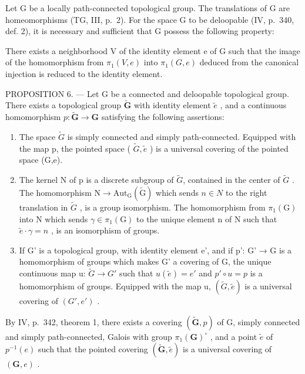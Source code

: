 Let G be a locally path-connected topological group. The translations of G are homeomorphisms (TG, III, p.~2). For the space G to be deloopable (IV, p.~340, def. 2), it is necessary and sufficient that G possess the following property:

There exists a neighborhood V of the identity element e of G such that the image of the homomorphism from \(\pi_{1}(V,e)\) into \(\pi_{1}(G,e)\) deduced from the canonical injection is reduced to the identity element.

PROPOSITION 6. --- Let G be a connected and deloopable topological group. There exists a topological group \(\widetilde{\mathbf{G}}\) with identity element \(\widetilde{e}\) , and a continuous homomorphism \(p\colon \widetilde{\mathbf{G}}\to \mathbf{G}\) satisfying the following assertions:

\begin{enumerate}
\def\labelenumi{\alph{enumi})}
\item
  The space \(\widetilde{G}\) is simply connected and simply path-connected. Equipped with the map p, the pointed space ( \(\widetilde{G},\widetilde{e}\) ) is a universal covering of the pointed space (G,e).
\item
  The kernel N of p is a discrete subgroup of \(\widetilde{G}\), contained in the center of \(\widetilde{G}\) . The homomorphism \(\mathrm{N}\to\mathrm{Aut}_{\mathrm{G}}(\widetilde{\mathrm{G}})\) which sends \(n\in N\) to the right translation in \(\widetilde{G}\) , is a group isomorphism. The homomorphism from \(\pi_{1}(\mathrm{G})\) into N which sends \(\gamma\in\pi_{1}(\mathrm{G})\) to the unique element n of N such that \(\widetilde{e}\cdot\gamma=n\) , is an isomorphism of groups.
\item
  If G' is a topological group, with identity element e', and if p': G' → G is a homomorphism of groups which makes G' a covering of G, the unique continuous map u: \(\widetilde{G} \rightarrow G'\) such that \(u(\widetilde{e}) = e'\) and \(p' \circ u = p\) is a homomorphism of groups. Equipped with the map u, \((\widetilde{G}, \widetilde{e})\) is a universal covering of \((G', e')\) .
\end{enumerate}

By IV, p.~342, theorem 1, there exists a covering \((\widetilde{\mathbf{G}},p)\) of G, simply connected and simply path-connected, Galois with group \(\pi_1(\mathbf{G})^\circ\) , and a point \(\widetilde{e}\) of \(p^{-1}(e)\) such that the pointed covering \((\widetilde{\mathbf{G}},\widetilde{e})\) is a universal covering of \((\mathbf{G},e)\) .

